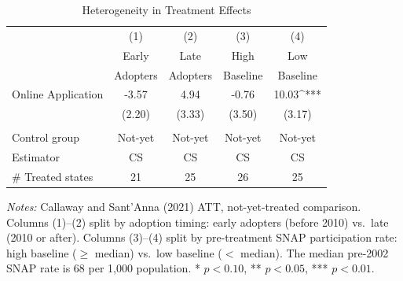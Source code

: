 \begin{table}[H]
\centering
\caption{Heterogeneity in Treatment Effects}
\label{tab:heterogeneity}
\begin{threeparttable}
\begin{tabular}{lcccc}
\toprule
 & (1) & (2) & (3) & (4) \\
 & Early & Late & High & Low \\
 & Adopters & Adopters & Baseline & Baseline \\
\midrule
Online Application & -3.57 & 4.94 & -0.76 & 10.03^{***} \\
 & (2.20) & (3.33) & (3.50) & (3.17) \\
 \\
Control group & Not-yet & Not-yet & Not-yet & Not-yet \\
Estimator & CS & CS & CS & CS \\
\# Treated states & 21 & 25 & 26 & 25 \\
\bottomrule
\end{tabular}
\begin{tablenotes}[flushleft]
\small
\item \textit{Notes:} Callaway and Sant'Anna (2021) ATT, not-yet-treated comparison. Columns (1)--(2) split by adoption timing: early adopters (before 2010) vs.\ late (2010 or after). Columns (3)--(4) split by pre-treatment SNAP participation rate: high baseline ($\geq$ median) vs.\ low baseline ($<$ median). The median pre-2002 SNAP rate is 68 per 1,000 population. * $p<0.10$, ** $p<0.05$, *** $p<0.01$.
\end{tablenotes}
\end{threeparttable}
\end{table}
